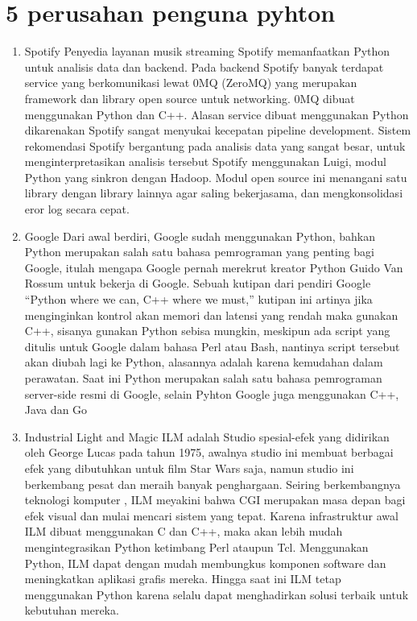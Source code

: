 \section{5 perusahan penguna pyhton}
\begin{enumerate}
    \item Spotify
Penyedia layanan musik streaming Spotify memanfaatkan Python untuk analisis data dan backend. Pada backend Spotify banyak terdapat service yang berkomunikasi lewat 0MQ (ZeroMQ) yang merupakan framework dan library open source untuk networking. 0MQ dibuat menggunakan Python dan C++. Alasan service dibuat menggunakan Python dikarenakan Spotify sangat menyukai kecepatan pipeline development.
Sistem rekomendasi Spotify bergantung pada analisis data yang sangat besar, untuk menginterpretasikan analisis tersebut Spotify menggunakan Luigi, modul Python yang sinkron dengan Hadoop. Modul open source ini menangani satu library dengan library lainnya agar saling bekerjasama, dan mengkonsolidasi eror log secara cepat.

    \item Google
Dari awal berdiri, Google sudah menggunakan Python, bahkan Python merupakan salah satu bahasa pemrograman yang penting bagi Google, itulah mengapa Google pernah merekrut kreator Python Guido Van Rossum untuk bekerja di Google.
Sebuah kutipan dari pendiri Google “Python where we can, C++ where we must,” kutipan ini artinya jika menginginkan kontrol akan memori dan latensi yang rendah maka gunakan C++, sisanya gunakan Python sebisa mungkin, meskipun ada script yang ditulis untuk Google dalam bahasa Perl atau Bash, nantinya script tersebut akan diubah lagi ke Python, alasannya adalah karena kemudahan dalam perawatan.
Saat ini Python merupakan salah satu bahasa pemrograman server-side resmi di Google, selain Pyhton Google juga menggunakan C++, Java dan Go

    \item Industrial Light and Magic
ILM adalah Studio spesial-efek yang didirikan oleh George Lucas pada tahun 1975, awalnya studio ini membuat berbagai efek yang dibutuhkan untuk film Star Wars saja, namun studio ini berkembang pesat dan meraih banyak penghargaan. Seiring berkembangnya teknologi komputer , ILM meyakini bahwa CGI merupakan masa depan bagi efek visual dan mulai mencari sistem yang tepat. Karena infrastruktur awal ILM dibuat menggunakan C dan C++, maka akan lebih mudah mengintegrasikan Python ketimbang Perl ataupun Tcl. Menggunakan Python, ILM dapat dengan mudah membungkus komponen software dan meningkatkan aplikasi grafis mereka. Hingga saat ini ILM tetap menggunakan Python karena selalu dapat menghadirkan solusi terbaik untuk kebutuhan mereka. 


\end{enumerate}
